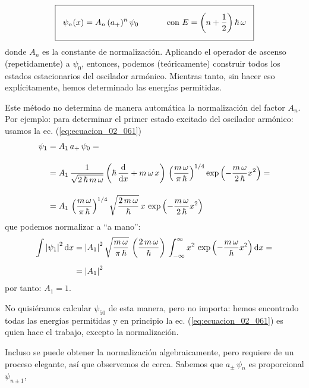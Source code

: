 \documentclass[12pt]{article}
\numberwithin{equation}{section}
\begin{document}
\begin{align}
\setlength{\fboxsep}{3\fboxsep}\boxed{ \psi_{n} (x) = A_{n} \, (a_{+})^{n} \, \psi_{0} \hspace{1.2cm} \mbox{con } E = \left( n + \dfrac{1}{2} \right) \hbar \, \omega}
\label{eq:ecuacion_02_061}
 \end{align}
donde $A_{n}$ es la constante de normalización. Aplicando el operador de ascenso (repetidamente) a $\psi_{0}$, entonces, podemos (teóricamente) construir todos los estados estacionarios del oscilador armónico. Mientras tanto, sin hacer eso explícitamente, hemos determinado las energías permitidas.
\par
Este método no determina de manera automática la normalización del factor $A_{n}$. Por ejemplo: para determinar el primer estado excitado del oscilador armónico: usamos la ec. (\ref{eq:ecuacion_02_061})
\begin{align}
\begin{aligned}[b]
\psi_{1} &= A_{1} \, a_{+} \, \psi_{0} = \\[1em]
&= A_{1} \, \dfrac{1}{\sqrt{2 \, \hbar \, m \, \omega}} \left( \hbar \, \dv{x} + m \, \omega \, x \right) \, \left( \dfrac{m \, \omega}{\pi \, \hbar} \right)^{1/4} \exp \left( - \dfrac{m \, \omega}{2 \, \hbar} x^{2} \right) = \\[1em]
&= A_{1} \, \left( \dfrac{m \, \omega}{\pi \, \hbar} \right)^{1/4} \sqrt{\dfrac{2 \, m \, \omega}{\hbar}} \, x \, \exp \left( - \dfrac{m \, \omega}{2 \, \hbar} x^{2} \right)
\end{aligned}
\label{eq:ecuacion_02_062}
\end{align}
que podemos normalizar a \enquote{a mano}:
\begin{align*}
\int \abs{\psi_{1}}^{2} \dd{x} &= \abs{A_{1}}^{2} \, \sqrt{ \dfrac{m \, \omega}{\pi \, \hbar}} \, \left( \dfrac{2 \, m \, \omega}{\hbar} \right) \,\int_{-\infty}^{\infty} x^{2} \, \exp \left( - \dfrac{m \, \omega}{\hbar} x^{2} \right) \dd{x} = \\[0.5em]
&= \abs{A_{1}}^{2}
\end{align*}
por tanto: $A_{1} = 1$.
\par
No quisiéramos calcular $\psi_{50}$ de esta manera, pero no importa: hemos encontrado todas las energías permitidas y en principio la ec. (\ref{eq:ecuacion_02_061}) es quien hace el trabajo, excepto la normalización.
\par
Incluso se puede obtener la normalización algebraicamente, pero requiere de un proceso elegante, así que observemos de cerca. Sabemos que $a_{\pm} \, \psi_{n}$ es proporcional $\psi_{n \pm 1}$,
\end{document}
